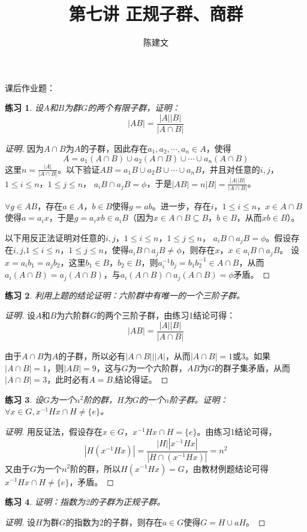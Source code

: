 \documentclass{article}
\newtheorem{Exercise}{练习}
\begin{document}
\begin{CJK*}{UTF8}{gbsn}
  \title{第七讲 正规子群、商群}
  \author{陈建文}
  \maketitle
  



课后作业题：
\begin{Exercise}
设$A$和$B$为群$G$的两个有限子群，证明：
\[|AB|=\frac{|A||B|}{|A\cap B|}\]
\end{Exercise}
\begin{proof}[证明]
  因为$A\cap B$为$A$的子群，因此存在$a_1,a_2,\cdots,a_n\in A$，使得
  \[A=a_1(A\cap B)\cup a_2(A\cap B)\cup \cdots \cup a_n(A\cap B)\]
  这里$n=\frac{|A|}{|A\cap B|}$。以下验证$AB=a_1B\cup a_2B\cup \cdots \cup a_nB$，并且对任意的$i,j$，$1\leq i \leq n$，$1\leq j \leq n$，
  $a_iB\cap a_jB=\phi$，于是$|AB|=n|B|=\frac{|A||B|}{|A\cap B|}$。

  $\forall g\in AB$，存在$a\in A$，$b\in B$使得$g=ab$。进一步，存在$i$，$1\leq i\leq n$，$x\in A\cap B$使得$a=a_ix$，于是$g=a_ixb\in a_iB$（因为$x\in A\cap B\subseteq B$，$b\in B$，从而$xb\in B$）。

以下用反正法证明对任意的$i,j$，$1\leq i \leq n$，$1\leq j \leq n$，
$a_iB\cap a_jB=\phi$。假设存在$i,j$,$1\leq i \leq n$，$1\leq j \leq n$，使得$a_iB\cap a_jB\neq \phi$，则存在$x$，$x\in a_iB\cap a_jB$。
设$x=a_ib_1=a_jb_2$，这里$b_1\in B$，$b_2\in B$，则$a_i^{-1}b_j=b_1b_2^{-1}\in A\cap B$，从而$a_i(A\cap B)=a_j(A\cap B)$，与$a_i(A\cap B)\cap a_j(A\cap B)=\phi$矛盾。

\end{proof}
\begin{Exercise}
  利用上题的结论证明：六阶群中有唯一的一个三阶子群。
\end{Exercise}
\begin{proof}[证明]
  设$A$和$B$为六阶群$G$的两个三阶子群，由练习1结论可得：
  \[|AB|=\frac{|A||B|}{|A\cap B|}\]

  由于$A\cap B$为$A$的子群，所以必有$|A\cap B|||A|$，从而$|A\cap B|=1$或$3$。如果$|A\cap B|=1$，则$|AB|=9$，这与$G$为一个六阶群，$AB$为$G$的群子集矛盾，从而$|A\cap B|=3$，此时必有$A=B$,结论得证。
\end{proof}
\begin{Exercise}
设$G$为一个$n^2$阶的群，$H$为$G$的一个$n$阶子群。证明：$\forall x\in G, x^{-1}Hx\cap H \neq \{e\}$。
\end{Exercise}
\begin{proof}[证明]
  用反证法，假设存在$x\in G$，$x^{-1}Hx\cap H = \{e\}$。由练习1结论可得，
  \[|H(x^{-1}Hx)|=\frac{|H||x^{-1}Hx|}{|H\cap (x^{-1}Hx)|}=n^2\]
  又由于$G$为一个$n^2$阶的群，所以$H(x^{-1}Hx)=G$，由教材例题结论可得$x^{-1}Hx\cap H \neq \{e\}$，矛盾。
\end{proof}
\begin{Exercise}
证明：指数为2的子群为正规子群。
\end{Exercise}
\begin{proof}[证明]
  设$H$为群$G$的指数为2的子群，则存在$a\in G$使得$G=H\cup aH$。



\end{proof}
\end{CJK*}
\end{document}
